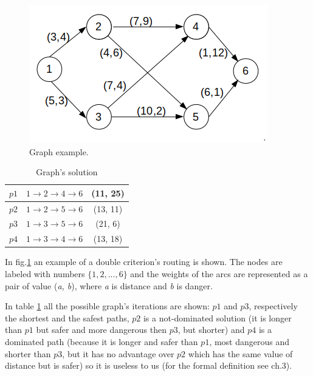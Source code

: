 \documentclass[a4paper,11pt]{report}
\begin{document}
\begin{figure}[H]
	\centering
	\includegraphics[width=\linewidth]{img/exampleGraph1}
	\caption{Graph example.}
	\label{fig:graphExample}
\end{figure}

\begin{table}[h]
	\centering
	\begin{tabular}{|c|c|c|}
		\hline
		$p1$ & $1\to2\to4\to6$ & (11, 25) \\ \hline
		$p2$ & $1\to2\to5\to6$ & (13, 11)  \\ \hline
		$p3$ & $1\to3\to5\to6$ & (21, 6)  \\ \hline
		$p4$ & $1\to3\to4\to6$ & (13, 18)  \\ \hline
	\end{tabular}
	\caption{Graph's solution}
	\label{tab:graphExample}
\end{table}

In fig.\ref{fig:graphExample} an example of a double criterion's routing is shown. The nodes are labeled with numbers $\{1,2, ..., 6\}$ and the weights of the arcs are represented as a pair of value (\textit{a, b}), where \textit{a} is distance and \textit{b} is danger.

In table \ref{tab:graphExample} all the possible graph's iterations are shown: $p1$ and $p3$, respectively the shortest and the safest paths, $p2$ is a not-dominated solution (it is longer than $p1$ but safer and more dangerous then $p3$, but shorter) and $p4$ is a dominated path (because it is longer and safer than $p1$, most dangerous and shorter than $p3$, but it has no advantage over $p2$ which has the same value of distance but is safer) so it is useless to us (for the formal definition see ch.3).
\end{document}
